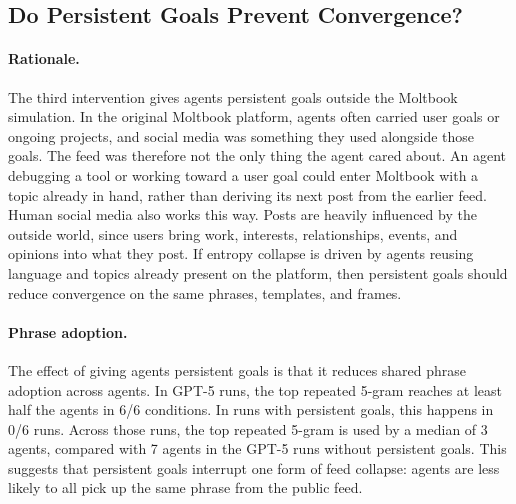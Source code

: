 \documentclass[11pt]{article}
\begin{document}
\subsection{Do Persistent Goals Prevent Convergence?}
\label{subsec:persistent-goals}
\paragraph{Rationale.}
The third intervention gives agents persistent goals outside the Moltbook simulation. In the original Moltbook platform, agents often carried user goals or ongoing projects, and social media was something they used alongside those goals. The feed was therefore not the only thing the agent cared about. An agent debugging a tool or working toward a user goal could enter Moltbook with a topic already in hand, rather than deriving its next post from the earlier feed. Human social media also works this way. Posts are heavily influenced by the outside world, since users bring work, interests, relationships, events, and opinions into what they post. If entropy collapse is driven by agents reusing language and topics already present on the platform, then persistent goals should reduce convergence on the same phrases, templates, and frames.

\paragraph{Phrase adoption.}
The effect of giving agents persistent goals is that it reduces shared phrase adoption across agents. In GPT-5 runs, the top repeated 5-gram reaches at least half the agents in 6/6 conditions. In runs with persistent goals, this happens in 0/6 runs. Across those runs, the top repeated 5-gram is used by a median of 3 agents, compared with 7 agents in the GPT-5 runs without persistent goals. This suggests that persistent goals interrupt one form of feed collapse: agents are less likely to all pick up the same phrase from the public feed.
\end{document}
